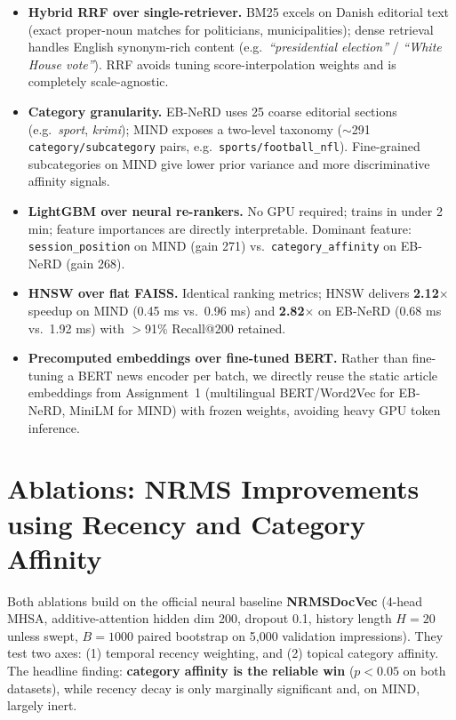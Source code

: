 \documentclass[11pt,a4paper]{article}
\begin{document}
\begin{itemize}
  \item \textbf{Hybrid RRF over single-retriever.} BM25 excels on Danish editorial text (exact proper-noun matches for politicians, municipalities); dense retrieval handles English synonym-rich content (e.g.\ \textit{``presidential election''} / \textit{``White House vote''}). RRF avoids tuning score-interpolation weights and is completely scale-agnostic.
  \item \textbf{Category granularity.} EB-NeRD uses 25 coarse editorial sections (e.g.\ \textit{sport}, \textit{krimi}); MIND exposes a two-level taxonomy ($\sim$291 \texttt{category/subcategory} pairs, e.g.\ \texttt{sports/football\_nfl}). Fine-grained subcategories on MIND give lower prior variance and more discriminative affinity signals.
  \item \textbf{LightGBM over neural re-rankers.} No GPU required; trains in under 2 min; feature importances are directly interpretable. Dominant feature: \texttt{session\_position} on MIND (gain 271) vs.\ \texttt{category\_affinity} on EB-NeRD (gain 268).
  \item \textbf{HNSW over flat FAISS.} Identical ranking metrics; HNSW delivers \textbf{2.12$\times$} speedup on MIND (0.45 ms vs.\ 0.96 ms) and \textbf{2.82$\times$} on EB-NeRD (0.68 ms vs.\ 1.92 ms) with $>$91\% Recall@200 retained.
  \item \textbf{Precomputed embeddings over fine-tuned BERT.} Rather than fine-tuning a BERT news encoder per batch, we directly reuse the static article embeddings from Assignment~1 (multilingual BERT/Word2Vec for EB-NeRD, MiniLM for MIND) with frozen weights, avoiding heavy GPU token inference.
\end{itemize}

\FloatBarrier

\section{Ablations: NRMS Improvements using Recency and Category Affinity}
\label{sec:q3}

Both ablations build on the official neural baseline \textbf{NRMSDocVec} (4-head MHSA, additive-attention hidden dim 200, dropout 0.1, history length $H{=}20$ unless swept, $B{=}1000$ paired bootstrap on 5{,}000 validation impressions). They test two axes: (1) temporal recency weighting, and (2) topical category affinity. The headline finding: \textbf{category affinity is the reliable win} ($p<0.05$ on both datasets), while recency decay is only marginally significant and, on MIND, largely inert.
\end{document}
